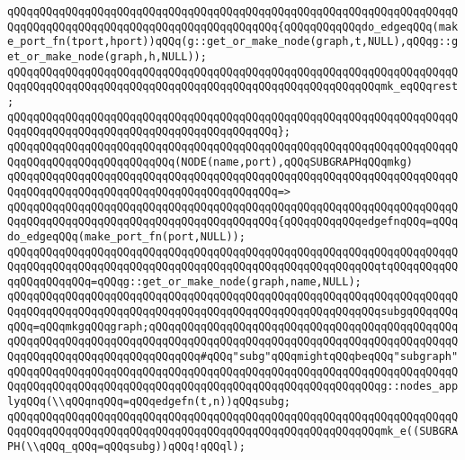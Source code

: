 \verb|qQQqqQQqqQQqqQQqqQQqqQQqqQQqqQQqqQQqqQQqqQQqqQQqqQQqqQQqqQQqqQQqqQQqqQQqqQQqqQQqqQQqqQQqqQQqqQQqqQQqqQQqqQQqqQQq{qQQqqQQqqQQqdo_edgeqQQq(make_port_fn(tport,hport))qQQq(g::get_or_make_node(graph,t,NULL),qQQqg::get_or_make_node(graph,h,NULL));|\newline
\verb|qQQqqQQqqQQqqQQqqQQqqQQqqQQqqQQqqQQqqQQqqQQqqQQqqQQqqQQqqQQqqQQqqQQqqQQqqQQqqQQqqQQqqQQqqQQqqQQqqQQqqQQqqQQqqQQqqQQqqQQqqQQqqQQqmk_eqQQqrest;|\newline
\verb|qQQqqQQqqQQqqQQqqQQqqQQqqQQqqQQqqQQqqQQqqQQqqQQqqQQqqQQqqQQqqQQqqQQqqQQqqQQqqQQqqQQqqQQqqQQqqQQqqQQqqQQqqQQqqQQq};|\newline
\newline
\verb|qQQqqQQqqQQqqQQqqQQqqQQqqQQqqQQqqQQqqQQqqQQqqQQqqQQqqQQqqQQqqQQqqQQqqQQqqQQqqQQqqQQqqQQqqQQqqQQq(NODE(name,port),qQQqSUBGRAPHqQQqmkg)|\newline
\verb|qQQqqQQqqQQqqQQqqQQqqQQqqQQqqQQqqQQqqQQqqQQqqQQqqQQqqQQqqQQqqQQqqQQqqQQqqQQqqQQqqQQqqQQqqQQqqQQqqQQqqQQqqQQqqQQq=>|\newline
\verb|qQQqqQQqqQQqqQQqqQQqqQQqqQQqqQQqqQQqqQQqqQQqqQQqqQQqqQQqqQQqqQQqqQQqqQQqqQQqqQQqqQQqqQQqqQQqqQQqqQQqqQQqqQQqqQQq{qQQqqQQqqQQqedgefnqQQq=qQQqdo_edgeqQQq(make_port_fn(port,NULL));|\newline
\verb|qQQqqQQqqQQqqQQqqQQqqQQqqQQqqQQqqQQqqQQqqQQqqQQqqQQqqQQqqQQqqQQqqQQqqQQqqQQqqQQqqQQqqQQqqQQqqQQqqQQqqQQqqQQqqQQqqQQqqQQqqQQqqQQqtqQQqqQQqqQQqqQQqqQQqqQQq=qQQqg::get_or_make_node(graph,name,NULL);|\newline
\verb|qQQqqQQqqQQqqQQqqQQqqQQqqQQqqQQqqQQqqQQqqQQqqQQqqQQqqQQqqQQqqQQqqQQqqQQqqQQqqQQqqQQqqQQqqQQqqQQqqQQqqQQqqQQqqQQqqQQqqQQqqQQqqQQqsubgqQQqqQQqqQQq=qQQqmkgqQQqgraph;qQQqqQQqqQQqqQQqqQQqqQQqqQQqqQQqqQQqqQQqqQQqqQQqqQQqqQQqqQQqqQQqqQQqqQQqqQQqqQQqqQQqqQQqqQQqqQQqqQQqqQQqqQQqqQQqqQQqqQQqqQQqqQQqqQQqqQQqqQQqqQQqqQQq#qQQq"subg"qQQqmightqQQqbeqQQq"subgraph"|\newline
\newline
\verb|qQQqqQQqqQQqqQQqqQQqqQQqqQQqqQQqqQQqqQQqqQQqqQQqqQQqqQQqqQQqqQQqqQQqqQQqqQQqqQQqqQQqqQQqqQQqqQQqqQQqqQQqqQQqqQQqqQQqqQQqqQQqqQQqg::nodes_applyqQQq(\\qQQqnqQQq=qQQqedgefn(t,n))qQQqsubg;|\newline
\newline
\verb|qQQqqQQqqQQqqQQqqQQqqQQqqQQqqQQqqQQqqQQqqQQqqQQqqQQqqQQqqQQqqQQqqQQqqQQqqQQqqQQqqQQqqQQqqQQqqQQqqQQqqQQqqQQqqQQqqQQqqQQqqQQqqQQqmk_e((SUBGRAPH(\\qQQq_qQQq=qQQqsubg))qQQq!qQQql);|\newline
